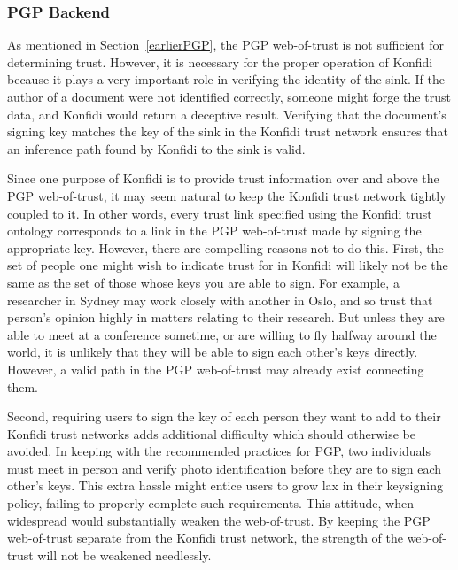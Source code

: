 \documentclass[onecolumn]{acm_proc_article-sp}
\begin{document}
\subsubsection{PGP Backend}
As mentioned in Section~\ref{earlierPGP}, the PGP web-of-trust is not sufficient for determining trust.  However, it is necessary for the proper operation of Konfidi because it plays a very important role in verifying the identity of the sink.  If the author of a document were not identified correctly, someone might forge the trust data, and Konfidi would return a deceptive result.  Verifying that the document's signing key matches the key of the sink in the Konfidi trust network ensures that an inference path found by Konfidi to the sink is valid.

Since one purpose of Konfidi is to provide trust information over and above the PGP web-of-trust, it may seem natural to keep the Konfidi trust network tightly coupled to it.  In other words, every trust link specified using the Konfidi trust ontology corresponds to a link in the PGP web-of-trust made by signing the appropriate key.  However, there are compelling reasons not to do this.  First, the set of people one might wish to indicate trust for in Konfidi will likely not be the same as the set of those whose keys you are able to sign.  For example, a researcher in Sydney may work closely with another in Oslo, and so trust that person's opinion highly in matters relating to their research.  But unless they are able to meet at a conference sometime, or are willing to fly halfway around the world, it is unlikely that they will be able to sign each other's keys directly.  However, a valid path in the PGP web-of-trust may already exist connecting them.

Second, requiring users to sign the key of each person they want to add to their Konfidi trust networks adds additional difficulty which should otherwise be avoided.  In keeping with the recommended practices for PGP, two individuals must meet in person and verify photo identification before they are to sign each other's keys.  This extra hassle might entice users to grow lax in their keysigning policy, failing to properly complete such requirements.  This attitude, when widespread would substantially weaken the web-of-trust.  By keeping the PGP web-of-trust separate from the Konfidi trust network, the strength of the web-of-trust will not be weakened needlessly.
\end{document}

